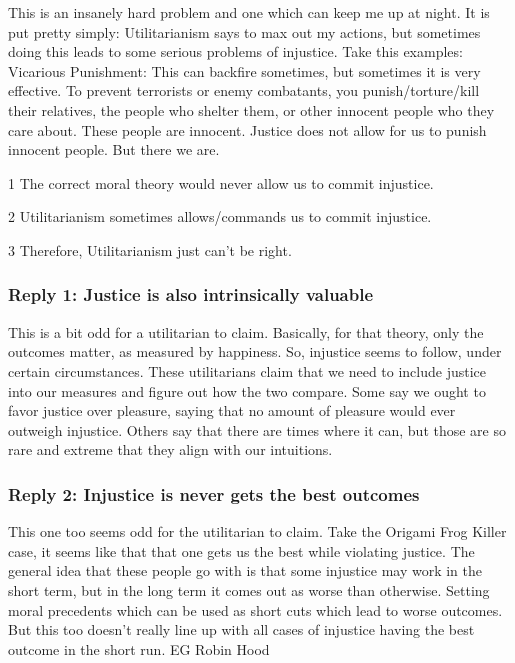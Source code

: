 This is an insanely hard problem and one which can keep me up at night. It is put pretty simply: Utilitarianism says to max out my actions, but sometimes doing this leads to some serious problems of injustice. Take this examples: Vicarious Punishment: This can backfire sometimes, but sometimes it is very effective. To prevent terrorists or enemy combatants, you punish/torture/kill their relatives, the people who shelter them, or other innocent people who they care about. These people are innocent. Justice does not allow for us to punish innocent people. But there we are.
\begin{earg}
    \item[1] The correct moral theory would never allow us to commit injustice.
    \item[2] Utilitarianism sometimes allows/commands us to commit injustice.
    \item[3] Therefore, Utilitarianism just can’t be right.
\end{earg}
\subsubsection{Reply 1: Justice is also intrinsically valuable}

This is a bit odd for a utilitarian to claim. Basically, for that theory, only the outcomes matter, as measured by happiness. So, injustice seems to follow, under certain circumstances. These utilitarians claim that we need to include justice into our measures and figure out how the two compare. Some say we ought to favor justice over pleasure, saying that no amount of pleasure would ever outweigh injustice. Others say that there are times where it can, but those are so rare and extreme that they align with our intuitions.
\subsubsection{Reply 2: Injustice is never gets the best outcomes}

This one too seems odd for the utilitarian to claim. Take the Origami Frog Killer case, it seems like that that one gets us the best while violating justice. The general idea that these people go with is that some injustice may work in the short term, but in the long term it comes out as worse than otherwise. Setting moral precedents which can be used as short cuts which lead to worse outcomes. But this too doesn’t really line up with all cases of injustice having the best outcome in the short run. EG Robin Hood
